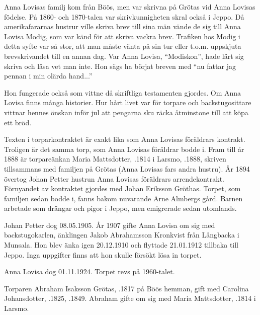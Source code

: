 Anna Lovisas familj kom från Böös, men var skrivna på Grötas vid Anna Lovisas födelse. På 1860- och 1870-talen var skrivkunnigheten skral också i Jeppo. Då amerikafararnas hustrur ville skriva brev till sina män vände de sig till Anna Lovisa Modig, som var känd för att skriva vackra brev. Trafiken hos Modig i detta syfte var så stor, att man måste vänta på sin tur eller t.o.m. uppskjuta brevskrivandet till en annan dag. Var Anna Lovisa, ``Modiskon'', hade lärt sig skriva och läsa vet man inte. Hon sägs ha börjat breven med ``nu fattar jag pennan i min olärda hand...''

Hon fungerade också som vittne då skriftliga testamenten gjordes. Om Anna Lovisa finns många historier. Hur hårt livet var för torpare och backstugosittare vittnar hennes önskan inför jul att pengarna sku räcka åtminstone till att köpa ett bröd.

Texten i torparkontraktet är exakt lika som Anna Lovisas föräldrars kontrakt. Troligen är det samma torp, som Anna Lovisas föräldrar bodde i. Fram till år 1888 är torpareänkan Maria Mattsdotter, .1814 i Larsmo, .1888, skriven tillsammans med familjen på Grötas (Anna Lovisas fars andra hustru). År 1894 övertog Johan Petter  hustrun Anna Lovisas föräldrars arrendekontrakt. Förnyandet av kontraktet gjordes med Johan Eriksson Gröthas. Torpet, som familjen sedan bodde i, fanns bakom nuvarande Arne Almbergs gård. Barnen arbetade som drängar och pigor i Jeppo, men emigrerade sedan utomlands.

Johan Petter dog 08.05.1905. År 1907 gifte Anna Lovisa om sig med backstugokarlen, änklingen Jakob Abrahamsson Kronkvist från Långbacka i Munsala. Hon blev änka igen 20.12.1910 och flyttade 21.01.1912 tillbaka till Jeppo. Inga uppgifter finns att hon skulle försökt lösa in torpet.

Anna Lovisa dog 01.11.1924. Torpet revs på 1960-talet.


Torparen Abraham Isaksson Grötas, .1817 på Böös hemman, gift med Carolina Johansdotter, .1825, .1849. Abraham gifte om sig med Maria Mattsdotter, .1814 i Larsmo.
\begin{jhchildren}
  \item {}
  \item {}
  \item {}
\end{jhchildren}

